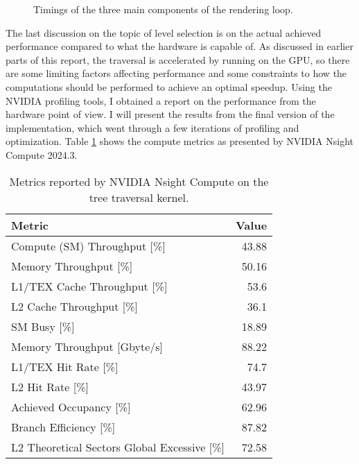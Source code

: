 \begin{figure}[H]
    \centering
    
    \caption{Timings of the three main components of the rendering loop.}
    \label{fig:variation}
\end{figure}

The last discussion on the topic of level selection is on the actual achieved performance compared to what the hardware is capable of. As discussed in earlier parts of this report, the traversal is accelerated by running on the GPU, so there are some limiting factors affecting performance and some constraints to how the computations should be performed to achieve an optimal speedup. Using the NVIDIA profiling tools, I obtained a report on the performance from the hardware point of view. I will present the results from the final version of the implementation, which went through a few iterations of profiling and optimization. Table \ref{tab:nsight} shows the compute metrics as presented by NVIDIA Nsight Compute 2024.3. 

\begin{table}[H]
\centering
\begin{tabular}{l|r}
\textbf{Metric}                                  & \multicolumn{1}{l}{\textbf{Value}} \\ \hline
Compute (SM) Throughput {[}\%{]}                 & 43.88                              \\
Memory Throughput {[}\%{]}                       & 50.16                              \\
L1/TEX Cache Throughput {[}\%{]}                 & 53.6                               \\
L2 Cache Throughput {[}\%{]}                     & 36.1                               \\
SM Busy {[}\%{]}                                 & 18.89                              \\
Memory Throughput {[}Gbyte/s{]}                  & 88.22                              \\
L1/TEX Hit Rate {[}\%{]}                         & 74.7                               \\
L2 Hit Rate {[}\%{]}                             & 43.97                              \\
Achieved Occupancy {[}\%{]}                      & 62.96                              \\
Branch Efficiency {[}\%{]}                       & 87.82                              \\
L2 Theoretical Sectors Global Excessive {[}\%{]} & 72.58                             
\end{tabular}
\caption{Metrics reported by NVIDIA Nsight Compute on the tree traversal kernel.}
\label{tab:nsight}
\end{table}

